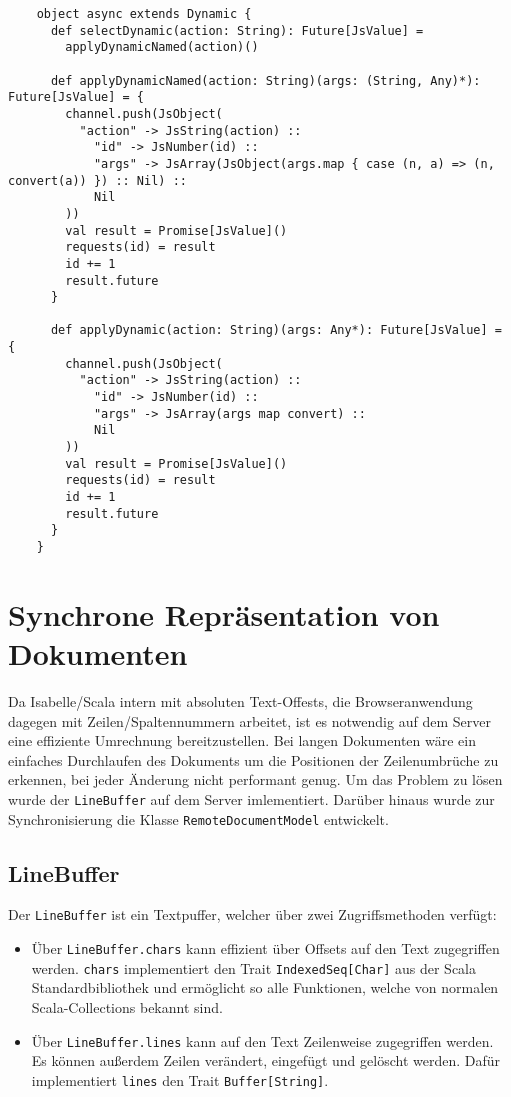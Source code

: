 \begin{lstlisting}
    object async extends Dynamic {
      def selectDynamic(action: String): Future[JsValue] =
        applyDynamicNamed(action)()

      def applyDynamicNamed(action: String)(args: (String, Any)*): Future[JsValue] = {
        channel.push(JsObject(
          "action" -> JsString(action) ::
            "id" -> JsNumber(id) ::
            "args" -> JsArray(JsObject(args.map { case (n, a) => (n, convert(a)) }) :: Nil) ::
            Nil
        ))
        val result = Promise[JsValue]()
        requests(id) = result
        id += 1
        result.future
      }

      def applyDynamic(action: String)(args: Any*): Future[JsValue] = {
        channel.push(JsObject(
          "action" -> JsString(action) ::
            "id" -> JsNumber(id) ::
            "args" -> JsArray(args map convert) ::
            Nil
        ))
        val result = Promise[JsValue]()
        requests(id) = result
        id += 1
        result.future
      }
    }
\end{lstlisting}

\clearpage

\section{Synchrone Repräsentation von Dokumenten}
\label{sec:linebuffer}

Da Isabelle/Scala intern mit absoluten Text-Offests, die Browseranwendung dagegen mit
Zeilen/Spaltennummern arbeitet, ist es notwendig auf dem Server eine effiziente Umrechnung
bereitzustellen. Bei langen Dokumenten wäre ein einfaches Durchlaufen des Dokuments um die
Positionen der Zeilenumbrüche zu erkennen, bei jeder Änderung nicht performant genug. Um das Problem
zu lösen wurde der \texttt{LineBuffer} auf dem Server imlementiert. Darüber hinaus wurde zur
Synchronisierung die Klasse \texttt{RemoteDocumentModel} entwickelt.

\subsection{LineBuffer}

Der \texttt{LineBuffer} ist ein Textpuffer, welcher über zwei Zugriffsmethoden verfügt:

\begin{itemize}
  \item Über \texttt{LineBuffer.chars} kann effizient über Offsets auf den Text zugegriffen werden. 
  \texttt{chars} implementiert den Trait \texttt{IndexedSeq[Char]} aus der Scala Standardbibliothek
  und ermöglicht so alle Funktionen, welche von normalen Scala-Collections bekannt sind.
  \item Über \texttt{LineBuffer.lines} kann auf den Text Zeilenweise zugegriffen werden. Es können 
  außerdem Zeilen verändert, eingefügt und gelöscht werden. Dafür implementiert \texttt{lines} den 
  Trait \texttt{Buffer[String]}.
\end{itemize}

